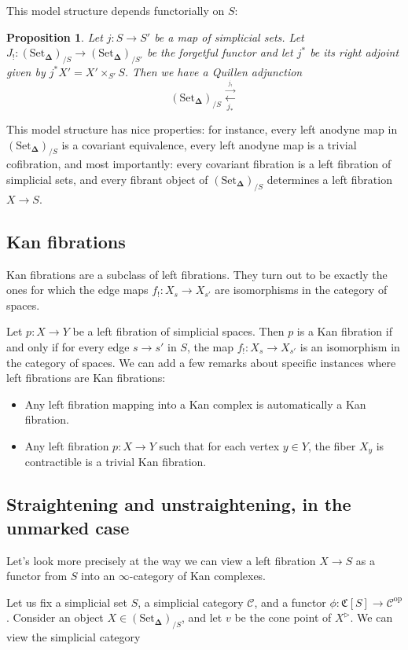 \documentclass[12pt]{amsart}
\newcommand{\8}{\ensuremath{\infty}}
\newcommand{\C}{\ensuremath{\mathscr{C}}}
\newcommand{\SSet}{\ensuremath{\text{Set}_{\boldsymbol{\Delta}}}}
\newcommand{\op}[1]{\ensuremath{{#1}^{\text{op}}}}
\newcommand{\adj}[2]{\ensuremath{\overset{\overset{#1}{ \rightarrow}}{\underset{#2}{\leftarrow}}}}
\newtheorem{proposition}{Proposition}
\begin{document}
This model structure depends functorially on $S$:
\begin{proposition}
  Let $j: S \rightarrow S'$ be a map of simplicial sets. Let $J_!: (\SSet)_{/S} \rightarrow (\SSet)_{/S'}$ be the forgetful functor and let $j^*$ be its right adjoint given by $j^*X' = X'\times_{S'} S$. Then we have a Quillen adjunction
  $$
    (\SSet)_{/S} \adj{j_!}{j_*}
  $$
\end{proposition}

This model structure has nice properties: for instance, every left anodyne map in $(\SSet)_{/S}$ is a covariant equivalence, every left anodyne map is a trivial cofibration, and most importantly: every covariant fibration is a left fibration of simplicial sets, and every fibrant object of $(\SSet)_{/S}$ determines a left fibration $X \rightarrow S$.

\subsection{Kan fibrations}
Kan fibrations are a subclass of left fibrations. They turn out to be exactly the ones for which the edge maps $f_!: X_s \rightarrow X_{s'}$ are isomorphisms in the category of spaces.

Let $p: X \rightarrow Y$ be a left fibration of simplicial spaces. Then $p$ is a Kan fibration if and only if for every edge $s \rightarrow s'$ in $S$, the map $f_!: X_s \rightarrow X_{s'}$ is an isomorphism in the category of spaces.
We can add a few remarks about specific instances where left fibrations are Kan fibrations:
\begin{itemize}
  \item Any left fibration mapping into a Kan complex is automatically a Kan fibration.
  \item Any left fibration $p: X \rightarrow Y$ such that for each vertex $y\in Y$, the fiber $X_y$ is contractible is a trivial Kan fibration.
\end{itemize}


\subsection{Straightening and unstraightening, in the unmarked case}

Let's look more precisely at the way we can view a left fibration $X \rightarrow S$ as a functor from $S$ into an $\8$-category of Kan complexes.

Let us fix a simplicial set $S$, a simplicial category $\C$, and a functor $\phi: \mathfrak{C}[S] \rightarrow \op\C$. Consider an object $X \in (\SSet)_{/S}$, and let $v$ be the cone point of $X^{\triangleright}$. We can view the simplicial category
\end{document}
